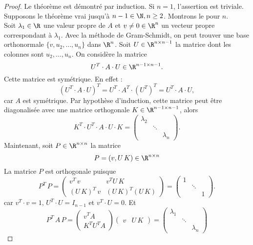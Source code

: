 \begin{proof}
  Le théorème est démontré par induction. Si $n=1$, l'assertion est triviale. \\
  Supposons le théorème vrai jusqu'à $n-1 \in \N, n \ge 2$. Montrons le pour $n$. \\
  Soit $\lambda_1 \in \R$
  une valeur propre de $A$
  et $v \neq 0 \in \R^n$
  un vecteur propre correspondant à $\lambda_1$.
  Avec la méthode de Gram-Schmidt, on peut trouver une base
  orthonormale $\{v,u_2,\dots,u_n\}$ dans $\R^n$. Soit $U \in \R^{n \times n-1}$ la matrice dont les colonnes sont $u_2,\dots,u_n$.  On considère la matrice
  \begin{displaymath}
    U^T \cdot A \cdot U \in \R^{n-1 \times n-1}.
  \end{displaymath}
  Cette matrice est symétrique. En effet :
  \begin{displaymath}
    (U^T \cdot A \cdot U)^T = U^T \cdot A^T \cdot (U^T)^T = U^T \cdot A \cdot U,
  \end{displaymath}
  car $A$ est symétrique. Par hypothèse d'induction, cette matrice peut être diagonalisée  avec une matrice orthogonale  $K \in \R^{ n-1 \times n-1}$, alors 
  \begin{displaymath}
    K^T \cdot  U^T \cdot A \cdot U \cdot K =
    \begin{pmatrix}
      \lambda_2 \\
      & \ddots \\
      && \lambda_n
    \end{pmatrix}. 
  \end{displaymath}
Maintenant, soit $P \in \R^{n \times n}$ la matrice 
\begin{displaymath}
  P = \left( v, U\,K\right) \in \R^{n \times n}
\end{displaymath} 
La matrice $P$ est orthogonale puisque 
\begin{displaymath}
  P^T \, P =
  \begin{pmatrix}
    v^T \, v & v^T U \, K \\
    (U\,K)^T \, v &  (U\,K)^T (U\,K)
  \end{pmatrix} = 
  \begin{pmatrix}
    1 \\
    & \ddots \\
    && 1 
  \end{pmatrix}. 
\end{displaymath}
car $v^T \cdot v = 1$, $U^T \cdot U = I_{n-1}$ et $v^T \cdot U = 0$. Et 
\begin{displaymath}
  P^T \, A \, P =
  \begin{pmatrix}
    v^T A \\
    K^T U^T A 
  \end{pmatrix}
  \begin{pmatrix}
    v & U\,K
  \end{pmatrix} =
  \begin{pmatrix}
    \lambda_1 \\
    & \ddots \\
    && \lambda_n
  \end{pmatrix}  
\end{displaymath}
\end{proof}


